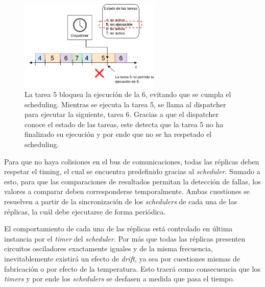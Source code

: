 \begin{figure}[htb]
    \centering
    \includegraphics[width=0.6\textwidth]{img/task_overrun.png}
    \caption{La tarea 5 bloquea la ejecución de la 6, evitando que se cumpla el scheduling. Mientras se ejecuta la tarea 5, se llama al dispatcher para ejecutar la siguiente, tarea 6. Gracias a que el dispatcher conoce el estado de las tareas, este detecta que la tarea 5 no ha finalizado su ejecución y por ende que no se ha respetado el scheduling.}
    \label{fig:task_overrun}
\end{figure}




Para que no haya colisiones en el bus de comunicaciones, todas las réplicas deben respetar el timing, el cual se encuentra predefinido gracias al \textit{scheduler}. Sumado a esto, para que las comparaciones de resultados permitan la detección de fallas, los valores a comparar deben corresponderse temporalmente. Ambas cuestiones se resuelven a partir de la sincronización de los \textit{schedulers} de cada una de las réplicas, la cuál debe ejecutarse de forma periódica.

El comportamiento de cada una de las réplicas está controlado en última instancia por el \textit{timer} del \textit{scheduler}. Por más que todas las réplicas presenten circuitos osciladores exactamente iguales y de la misma frecuencia, inevitablemente existirá un efecto de \textit{drift}, ya sea por cuestiones mismas de fabricación o por efecto de la temperatura. Esto traerá como consecuencia que los \textit{timers} y por ende los \textit{schedulers} se desfasen a medida que pasa el tiempo. 

